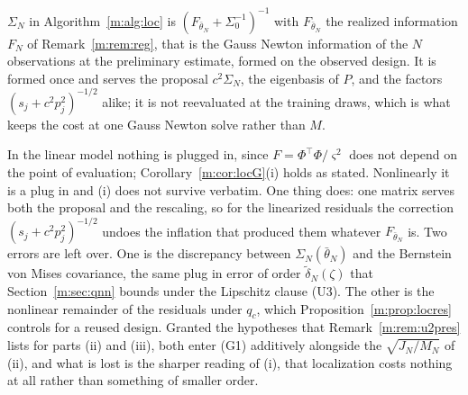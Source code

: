 \begin{remark}\label{m:rem:whichcov}
$\Sigma_N$ in Algorithm~\ref{m:alg:loc} is $(F_{\bar\theta_N}+\Sigma_0^{-1})^{-1}$ with $F_{\bar\theta_N}$ the realized information $F_N$ of Remark~\ref{m:rem:reg}, that is the Gauss Newton information of the $N$ observations at the preliminary estimate, formed on the observed design. It is formed once and serves the proposal $c^2\Sigma_N$, the eigenbasis of $P$, and the factors $(s_j+c^2p_j^2)^{-1/2}$ alike; it is not reevaluated at the training draws, which is what keeps the cost at one Gauss Newton solve rather than $M$.

In the linear model nothing is plugged in, since $F=\Phi^\top\Phi/\varsigma^2$ does not depend on the point of evaluation; Corollary~\ref{m:cor:locG}(i) holds as stated. Nonlinearly it is a plug in and (i) does not survive verbatim. One thing does: one matrix serves both the proposal and the rescaling, so for the linearized residuals the correction $(s_j+c^2p_j^2)^{-1/2}$ undoes the inflation that produced them whatever $F_{\bar\theta_N}$ is. Two errors are left over. One is the discrepancy between $\Sigma_N(\bar\theta_N)$ and the Bernstein von Mises covariance, the same plug in error of order $\tilde\delta_N(\zeta)$ that Section~\ref{m:sec:qnn} bounds under the Lipschitz clause (U3). The other is the nonlinear remainder of the residuals under $q_c$, which Proposition~\ref{m:prop:locres} controls for a reused design. Granted the hypotheses that Remark~\ref{m:rem:u2pres} lists for parts (ii) and (iii), both enter (G1) additively alongside the $\sqrt{J_N/M_N}$ of (ii), and what is lost is the sharper reading of (i), that localization costs nothing at all rather than something of smaller order.
\end{remark}


